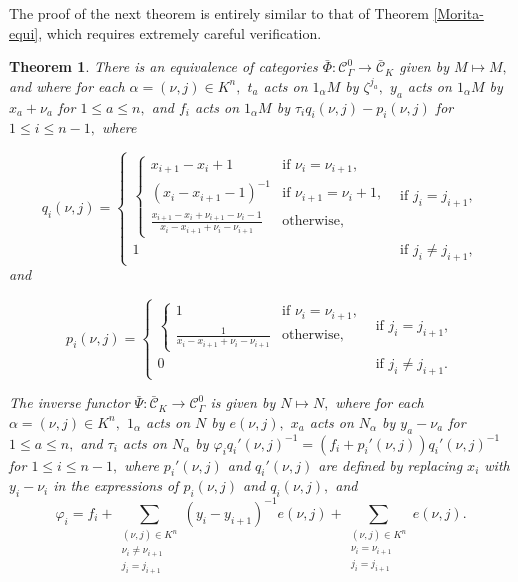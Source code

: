 \documentclass[11pt, reqno]{amsart} \textwidth=14.9cm \oddsidemargin=1cm \evensidemargin=1cm
\newtheorem{theorem}{Theorem}[section]
\theoremstyle{definition}
\numberwithin{equation}{section}
\begin{document}
The proof of the next theorem is entirely similar to that of Theorem \ref{Morita-equi}, which requires extremely careful verification.
\begin{theorem}\label{dege-Morita-equi}
There is an equivalence of categories $\bar{\Phi}: \mathcal{C}_{\Gamma}^{0}\rightarrow \bar{\mathcal{C}}_{K}$ given by $M\mapsto M,$ and where for each $\alpha=(\nu, j)\in K^{n},$ $t_{a}$ acts on $1_{\alpha}M$ by $\zeta^{j_{a}},$ $y_{a}$ acts on $1_{\alpha}M$ by $x_{a}+\nu_{a}$ for $1\leq a\leq n,$ and $f_{i}$ acts on $1_{\alpha}M$ by $\tau_{i}q_{i}(\nu, j)-p_{i}(\nu, j)$ for $1\leq i\leq n-1,$ where

\[q_{i}(\nu, j)=
\begin{cases}
\begin{cases}
x_{i+1}-x_{i}+1 & \text{if } \nu_i = \nu_{i+1},
\\
\left(x_{i}-x_{i+1}-1\right)^{-1} & \text{if } \nu_{i+1} =\nu_{i}+1,
\\
\frac{x_{i+1}-x_{i}+\nu_{i+1}-\nu_{i}-1}
{x_{i}-x_{i+1}+\nu_{i}-\nu_{i+1}}
 & \text{otherwise},
\end{cases}
& \text{if } j_i = j_{i+1},
\\
1 & \text{if } j_i \neq j_{i+1},
\end{cases}
\]
\setlength{\parskip}{2pt}
and

\[p_{i}(\nu, j)=
\begin{cases}
\begin{cases}
1 & \text{if } \nu_i = \nu_{i+1},
\\
\frac{1}{x_{i}-x_{i+1}+\nu_{i}-\nu_{i+1}}
 & \text{otherwise},
\end{cases}
& \text{if } j_i = j_{i+1},
\\
0 & \text{if } j_i \neq j_{i+1}.
\end{cases}
\]

The inverse functor $\bar{\Psi}: \bar{\mathcal{C}}_{K}\rightarrow \mathcal{C}_{\Gamma}^{0}$ is given by $N\mapsto N,$ where for each $\alpha=(\nu, j)\in K^{n},$ $1_{\alpha}$ acts on $N$ by $e(\nu, j),$ $x_{a}$ acts on $N_{\alpha}$ by $y_{a}-\nu_{a}$ for $1\leq a\leq n,$ and $\tau_{i}$ acts on $N_{\alpha}$ by $\varphi_{i}q_{i}'(\nu, j)^{-1}=(f_{i}+p_{i}'(\nu, j))q_{i}'(\nu, j)^{-1}$ for $1\leq i\leq n-1,$ where $p_{i}'(\nu, j)$ and $q_{i}'(\nu, j)$ are defined by replacing $x_{i}$ with $y_{i}-\nu_{i}$ in the expressions of $p_{i}(\nu, j)$ and $q_{i}(\nu, j),$ and
\[\varphi_i=f_i + \sum_{\substack{(\nu, j) \in K^{n} \\ \nu_i \neq \nu_{i+1} \\ j_i = j_{i+1}}} \left(y_i-y_{i+1}\right)^{-1} e(\nu, j) + \sum_{\substack{(\nu, j) \in K^{n} \\ \nu_i = \nu_{i+1} \\ j_i = j_{i+1}}} e(\nu, j).
\]
\end{theorem}
\end{document}
